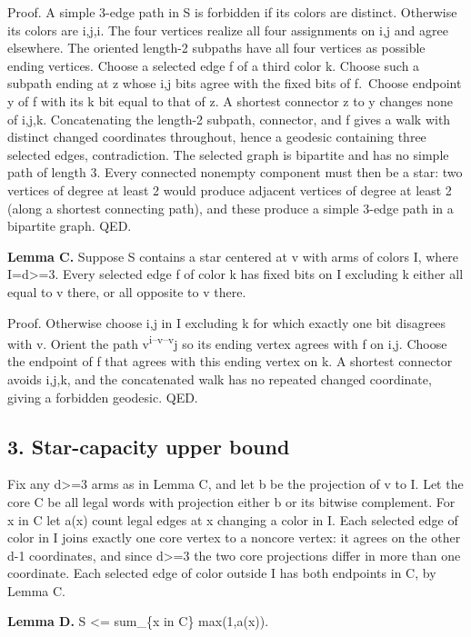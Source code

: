 \documentclass[
  10pt,
]{article}
\begin{document}
Proof. A simple 3-edge path in S is forbidden if its colors are
distinct. Otherwise its colors are i,j,i. The four vertices realize all
four assignments on i,j and agree elsewhere. The oriented length-2
subpaths have all four vertices as possible ending vertices. Choose a
selected edge f of a third color k. Choose such a subpath ending at z
whose i,j bits agree with the fixed bits of f.~Choose endpoint y of f
with its k bit equal to that of z. A shortest connector z to y changes
none of i,j,k. Concatenating the length-2 subpath, connector, and f
gives a walk with distinct changed coordinates throughout, hence a
geodesic containing three selected edges, contradiction. The selected
graph is bipartite and has no simple path of length 3. Every connected
nonempty component must then be a star: two vertices of degree at least
2 would produce adjacent vertices of degree at least 2 (along a shortest
connecting path), and these produce a simple 3-edge path in a bipartite
graph. QED.

\textbf{Lemma C.} Suppose S contains a star centered at v with arms of
colors I, where \textbar I\textbar=d\textgreater=3. Every selected edge
f of color k has fixed bits on I excluding k either all equal to v
there, or all opposite to v there.

Proof. Otherwise choose i,j in I excluding k for which exactly one bit
disagrees with v. Orient the path v\textsuperscript{i--v--v}j so its
ending vertex agrees with f on i,j. Choose the endpoint of f that agrees
with this ending vertex on k. A shortest connector avoids i,j,k, and the
concatenated walk has no repeated changed coordinate, giving a forbidden
geodesic. QED.

\subsection{3. Star-capacity upper
bound}\label{star-capacity-upper-bound}

Fix any d\textgreater=3 arms as in Lemma C, and let b be the projection
of v to I. Let the core C be all legal words with projection either b or
its bitwise complement. For x in C let a(x) count legal edges at x
changing a color in I. Each selected edge of color in I joins exactly
one core vertex to a noncore vertex: it agrees on the other d-1
coordinates, and since d\textgreater=3 the two core projections differ
in more than one coordinate. Each selected edge of color outside I has
both endpoints in C, by Lemma C.

\textbf{Lemma D.} \textbar S\textbar{} \textless= sum\_\{x in C\}
max(1,a(x)).
\end{document}
